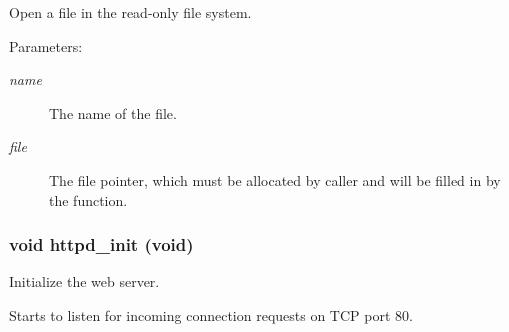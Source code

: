 Open a file in the read-only file system. 

\begin{Desc}
\item[Parameters:]
\begin{description}
\item[{\em name}]The name of the file.\item[{\em file}]The file pointer, which must be allocated by caller and will be filled in by the function. \end{description}
\end{Desc}
\hypertarget{a00082_gc364305cee969a0be43c071722b136e6}{
\subsubsection[httpd\_\-init]{\setlength{\rightskip}{0pt plus 5cm}void httpd\_\-init (void)}}
\label{a00082_gc364305cee969a0be43c071722b136e6}


Initialize the web server. 

Starts to listen for incoming connection requests on TCP port 80. 